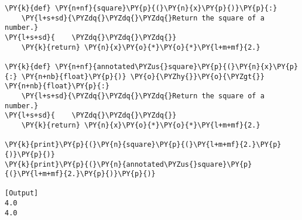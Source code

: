 \begin{Verbatim}[label=\makebox{\url{https://github.com/lucabaldini/cmepda/tree/master/slides/latex/snippets/type\_annotation.py}},commandchars=\\\{\}]
\PY{k}{def} \PY{n+nf}{square}\PY{p}{(}\PY{n}{x}\PY{p}{)}\PY{p}{:}
    \PY{l+s+sd}{\PYZdq{}\PYZdq{}\PYZdq{}Return the square of a number.}
\PY{l+s+sd}{    \PYZdq{}\PYZdq{}\PYZdq{}}
    \PY{k}{return} \PY{n}{x}\PY{o}{*}\PY{o}{*}\PY{l+m+mf}{2.}

\PY{k}{def} \PY{n+nf}{annotated\PYZus{}square}\PY{p}{(}\PY{n}{x}\PY{p}{:} \PY{n+nb}{float}\PY{p}{)} \PY{o}{\PYZhy{}}\PY{o}{\PYZgt{}} \PY{n+nb}{float}\PY{p}{:}
    \PY{l+s+sd}{\PYZdq{}\PYZdq{}\PYZdq{}Return the square of a number.}
\PY{l+s+sd}{    \PYZdq{}\PYZdq{}\PYZdq{}}
    \PY{k}{return} \PY{n}{x}\PY{o}{*}\PY{o}{*}\PY{l+m+mf}{2.}

\PY{k}{print}\PY{p}{(}\PY{n}{square}\PY{p}{(}\PY{l+m+mf}{2.}\PY{p}{)}\PY{p}{)}
\PY{k}{print}\PY{p}{(}\PY{n}{annotated\PYZus{}square}\PY{p}{(}\PY{l+m+mf}{2.}\PY{p}{)}\PY{p}{)}

[Output]
4.0
4.0
\end{Verbatim}